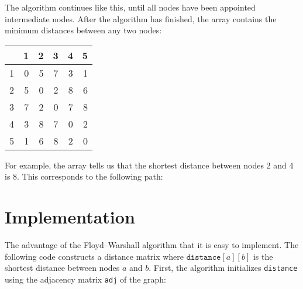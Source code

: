 \documentclass[twoside,12pt,a4paper,english]{book}
\theoremstyle{definition}
\theoremstyle{problemstyle}
\begin{document}
The algorithm continues like this,
until all nodes have been appointed intermediate nodes.
After the algorithm has finished, the array contains
the minimum distances between any two nodes:

\begin{center}
\begin{tabular}{r|rrrrr}
 & 1 & 2 & 3 & 4 & 5 \\
\hline
1 & 0 & 5 & 7 & 3 & 1 \\
2 & 5 & 0 & 2 & 8 & 6 \\
3 & 7 & 2 & 0 & 7 & 8 \\
4 & 3 & 8 & 7 & 0 & 2 \\
5 & 1 & 6 & 8 & 2 & 0 \\
\end{tabular}
\end{center}

For example, the array tells us that the
shortest distance between nodes 2 and 4 is 8.
This corresponds to the following path:

\begin{center}
\end{center}

\section{Implementation}

The advantage of the
Floyd–Warshall algorithm that it is
easy to implement.
The following code constructs a
distance matrix where $\texttt{distance}[a][b]$
is the shortest distance between nodes $a$ and $b$.
First, the algorithm initializes \texttt{distance}
using the adjacency matrix \texttt{adj} of the graph:
\end{document}
